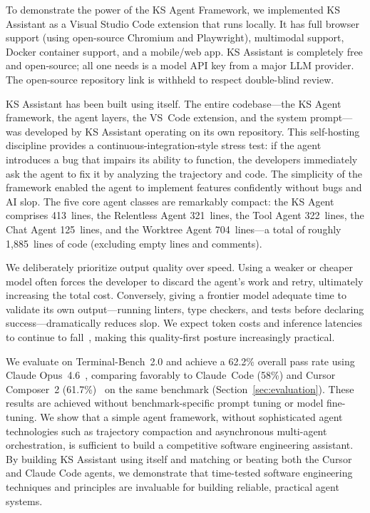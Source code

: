 \documentclass{article}
\begin{document}
To demonstrate the power of the KS Agent Framework, we implemented KS Assistant as a Visual Studio Code extension that runs locally.  It has full browser support (using open-source Chromium and Playwright), multimodal support, Docker container support, and a mobile/web app.  KS Assistant is completely free and open-source; all one needs is a model API key from a major LLM provider.  The open-source repository link is withheld to respect double-blind review.

KS Assistant has been built using itself.  The entire codebase---the KS Agent framework, the agent layers, the VS~Code extension, and the system prompt---was developed by KS Assistant operating on its own repository.  This self-hosting discipline provides a continuous-integration-style stress test: if the agent introduces a bug that impairs its ability to function, the developers immediately ask the agent to fix it by analyzing the trajectory and code.  The simplicity of the framework enabled the agent to implement features confidently without bugs and AI slop.  The five core agent classes are remarkably compact: the KS Agent comprises 413~lines, the Relentless Agent 321~lines, the Tool Agent 322~lines, the Chat Agent 125~lines, and the Worktree Agent 704~lines---a total of roughly 1,885~lines of code (excluding empty lines and comments).

We deliberately prioritize output quality over speed.  Using a weaker or cheaper model often forces the developer to discard the agent's work and retry, ultimately increasing the total cost.  Conversely, giving a frontier model adequate time to validate its own output---running linters, type checkers, and tests before declaring success---dramatically reduces slop.  We expect token costs and inference latencies to continue to fall~\citep{gao2025trae}, making this quality-first posture increasingly practical.

We evaluate on Terminal-Bench~2.0 and achieve a 62.2\% overall pass rate using Claude Opus~4.6~\citep{anthropic2026opus46}, comparing favorably to Claude~Code (58\%) and Cursor Composer~2 (61.7\%)~\citep{cursor2026composer2} on the same benchmark (Section~\ref{sec:evaluation}).  These results are achieved without benchmark-specific prompt tuning or model fine-tuning.  We show that a simple agent framework, without sophisticated agent technologies such as trajectory compaction and asynchronous multi-agent orchestration, is sufficient to build a competitive software engineering assistant.  By building KS Assistant using itself and matching or beating both the Cursor and Claude Code agents, we demonstrate that time-tested software engineering techniques and principles are invaluable for building reliable, practical agent systems.
\end{document}
